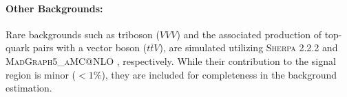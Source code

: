\paragraph{\textbf{Other Backgrounds:}}
Rare backgrounds such as triboson ($VVV$) and the associated production of top-quark pairs with a vector boson ($t\bar{t}V$), are simulated utilizing \textsc{Sherpa} 2.2.2 \cite{Bothmann:2019yzt} and \textsc{MadGraph5\_aMC@NLO} \cite{Alwall:2014hca}, respectively. While their contribution to the signal region is minor ($<1\%$), they are included for completeness in the background estimation.